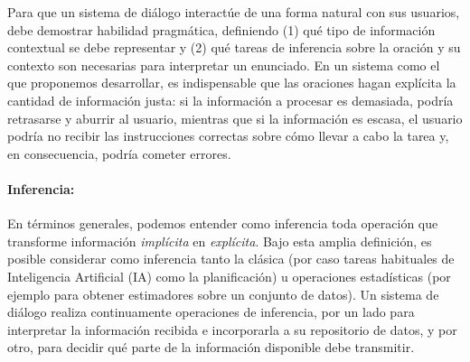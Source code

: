 Para que un sistema de di\'alogo interact\'ue de una forma natural con sus usuarios, debe
demostrar habilidad pragm\'atica, definiendo (1) qu\'e tipo de informaci\'on contextual se debe representar y (2) qu\'e tareas de inferencia sobre la oraci\'on y
su contexto son necesarias para interpretar un enunciado. 
En un sistema como el que proponemos desarrollar,
es indispensable que las oraciones hagan expl\'icita la cantidad de informaci\'on
justa: si la informaci\'on a procesar es demasiada, podr\'ia  retrasarse y aburrir al usuario, mientras que
si la informaci\'on es escasa, el usuario podr\'ia no recibir las instrucciones correctas sobre c\'omo llevar a cabo la
tarea y, en consecuencia, podr\'ia cometer errores.


%
%

  \paragraph{Inferencia:} En t\'erminos generales, podemos entender como
  inferencia toda operaci\'on que transforme informaci\'on \textit{impl\'icita} en
  \textit{expl\'icita}.  Bajo esta amplia definici\'on, es posible considerar como
  inferencia tanto la cl\'asica (por caso
  tareas habituales de Inteligencia Artificial (IA) como la planificaci\'on) u operaciones estad\'isticas (por ejemplo para obtener estimadores sobre un conjunto de datos).  Un sistema de di\'alogo realiza continuamente operaciones de inferencia, por un lado   para interpretar la informaci\'on recibida e incorporarla a su repositorio de datos, y por otro, para decidir qu\'e parte de la informaci\'on disponible debe transmitir.

